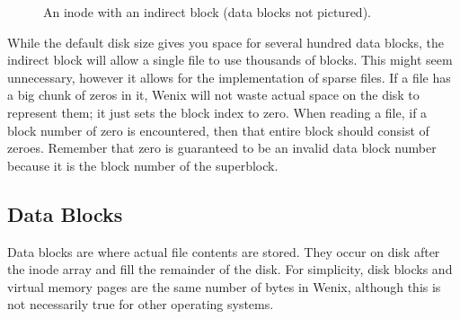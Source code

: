 \begin{figure}
    \centering
    \caption{An inode with an indirect block (data blocks not pictured).}
\end{figure}

While the default disk size gives you space for several hundred data blocks, the indirect block will allow a single file to use thousands of blocks. This might seem unnecessary, however it allows for the implementation of sparse files. If a file has a big chunk of zeros in it, Wenix will not waste actual space on the disk to represent them; it just sets the block index to zero. When reading a file, if a block number of zero is encountered, then that entire block should consist of zeroes. Remember that zero is guaranteed to be an invalid data block number because it is the block number of the superblock.

\subsection{Data Blocks} \label{datablocks}

Data blocks are where actual file contents are stored. They occur on disk after the inode array and fill the remainder of the disk. For simplicity, disk blocks and virtual memory pages are the same number of bytes in Wenix, although this is not necessarily true for other operating systems.

